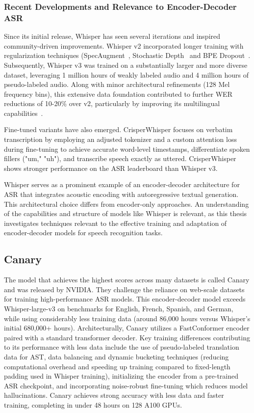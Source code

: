 \subsubsection{Recent Developments and Relevance to Encoder-Decoder ASR}
Since its initial release, Whisper has seen several iterations and inspired community-driven improvements. Whisper v2 incorporated longer training with regularization techniques (SpecAugment~\cite{Park2019SpecAugment}, Stochastic Depth~\cite{Stochastic_depth} and BPE Dropout~\cite{Provilkov_2020}. Subsequently, Whisper v3 was trained on a substantially larger and more diverse dataset, leveraging 1 million hours of weakly labeled audio and 4 million hours of pseudo-labeled audio. Along with minor architectural refinements (128 Mel frequency bins), this extensive data foundation contributed to further WER reductions of 10-20\% over v2, particularly by improving its multilingual capabilities~\cite{huggingface_whisper_large_v3_card}.

Fine-tuned variants have also emerged. CrisperWhisper \cite{zusag2024crisperwhisper} focuses on verbatim transcription by employing an adjusted tokenizer and a custom attention loss during fine-tuning to achieve accurate word-level timestamps, differentiate spoken fillers ("um," "uh"), and transcribe speech exactly as uttered. CrisperWhisper shows stronger performance on the ASR leaderboard \cite{open-asr-leaderboard} than Whisper v3.

Whisper serves as a prominent example of an encoder-decoder architecture for ASR that integrates acoustic encoding with autoregressive textual generation. This architectural choice differs from encoder-only approaches. An understanding of the capabilities and structure of models like Whisper is relevant, as this thesis investigates techniques relevant to the effective training and adaptation of encoder-decoder models for speech recognition tasks.


\subsection{Canary}\label{subsec:canary}

The model that achieves the highest scores across many datasets is called Canary \cite{puvvada2024accurate} and was released by NVIDIA. They challenge the reliance on web-scale datasets for training high-performance ASR models. This encoder-decoder model exceeds Whisper-large-v3 on benchmarks for English, French, Spanish, and German, while using considerably less training data (around 86,000 hours versus Whisper's initial 680,000+ hours). Architecturally, Canary utilizes a FastConformer encoder paired with a standard transformer decoder. Key training differences contributing to its performance with less data include the use of pseudo-labeled translation data for AST, data balancing and dynamic bucketing techniques (reducing computational overhead and speeding up training compared to fixed-length padding used in Whisper training), initializing the encoder from a pre-trained ASR checkpoint, and incorporating noise-robust fine-tuning which reduces model hallucinations. Canary achieves strong accuracy with less data and faster training, completing in under 48 hours on 128 A100 GPUs.


